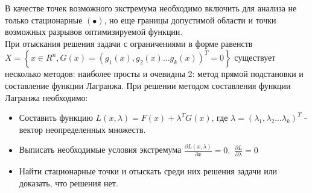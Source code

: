 \documentclass[preprint,russian,a5paper,10pt,twoside,mediummath]{ncc}
\begin{document}
В качестве точек возможного экстремума необходимо включить для анализа не только стационарные $\left( \bullet  \right)$, но еще границы допустимой области и точки возможных разрывов оптимизируемой функции.  
\\При отыскания решения задачи с ограничениями в форме равенств $X=\left\{ x\in {{R}^{n}},G\left( x \right)={{\left( {{g}_{1}}\left( x \right),{{g}_{2}}\left( x \right)...{{g}_{k}}\left( x \right) \right)}^{T}}=0 \right\}$ существует несколько методов: наиболее просты и очевидны 2: метод прямой подстановки и составление функции Лагранжа. При решении методом составления функции Лагранжа необходимо:
\begin{itemize}
\item Составить функцию $L\left( x,\lambda  \right)=F\left( x \right)+{{\lambda }^{T}}G\left( x \right)$, где $\lambda ={{\left( {{\lambda }_{1}},{{\lambda }_{2}}...{{\lambda }_{k}} \right)}^{T}}$ - вектор неопределенных множеств.
\item Выписать необходимые условия экстремума $\frac{\partial L\left( x,\lambda  \right)}{\partial x}=0,\,\,\frac{\partial L}{\partial \lambda }=0$
\item Найти стационарные точки и отыскать среди них решения задачи или доказать, что решения нет.
\end{itemize}
  
\end{document}

